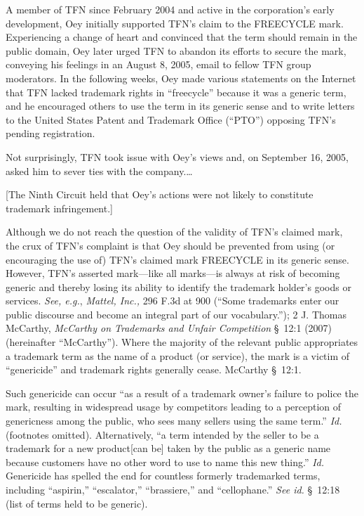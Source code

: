 A member of TFN since February 2004 and active in the corporation's early
development, Oey initially supported TFN's claim to the FREECYCLE mark.
Experiencing a change of heart and convinced that the term should remain in the
public domain, Oey later urged TFN to abandon its efforts to secure the mark,
conveying his feelings in an August 8, 2005, email to fellow TFN group
moderators. In
the
following weeks, Oey made various statements on the Internet that TFN lacked
trademark rights in ``freecycle'' because it was a generic term, and he
encouraged others to use the term in its generic sense and to write letters to
the United States Patent and Trademark Office (``PTO'') opposing TFN's pending
registration.

Not surprisingly, TFN took issue with Oey's views and, on September 16, 2005,
asked him to sever ties with the company.\ldots

[The Ninth Circuit held that Oey's actions were not likely to constitute
trademark infringement.]


Although we do not reach the question of the validity of TFN's claimed mark, the
crux of TFN's complaint is that Oey should be prevented from using (or
encouraging the use of) TFN's claimed mark FREECYCLE in its generic sense.
However, TFN's asserted mark---like all marks---is always at risk of becoming
generic and thereby losing its ability to identify the trademark holder's goods
or services. \textit{See, e.g.}, \textit{Mattel, Inc.,} 296 F.3d at 900 (``Some
trademarks enter our public discourse and become an integral part of our
vocabulary.''); 2 J. Thomas McCarthy, \emph{McCarthy on Trademarks and Unfair
Competition} \S~12:1 (2007) (hereinafter ``McCarthy''). Where the majority of
the relevant public appropriates a trademark term as the name of a product (or
service), the mark is a victim of ``genericide'' and trademark rights generally
cease. McCarthy \S~12:1.

Such genericide can occur ``as a result of a trademark owner's failure to police
the mark, resulting in widespread usage by competitors leading to a perception
of genericness among the public, who sees many sellers using the same term.''
\textit{Id.} (footnotes omitted). Alternatively, ``a term intended by the seller
to be a trademark for a new product[can be] taken by the public as a generic
name because customers have no other word to use to name this new thing.''
\textit{Id.} Genericide has spelled the end for countless formerly trademarked
terms, including ``aspirin,'' ``escalator,'' ``brassiere,'' and ``cellophane.''
\textit{See id.} \S~12:18 (list of terms held to be generic).

